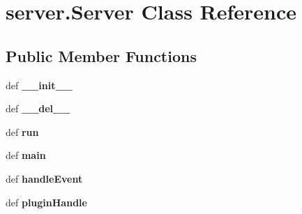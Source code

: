 \hypertarget{classserver_1_1_server}{\section{server.\-Server \-Class \-Reference}
\label{classserver_1_1_server}
}
\subsection*{\-Public \-Member \-Functions}
\begin{DoxyCompactItemize}
\item 
\hypertarget{classserver_1_1_server_a423441de73b670b0f72d1cd83e6e9b96}{def {\bfseries \-\_\-\-\_\-init\-\_\-\-\_\-}}\label{classserver_1_1_server_a423441de73b670b0f72d1cd83e6e9b96}

\item 
\hypertarget{classserver_1_1_server_ac80c3a945398c3c941f5d0820c823b88}{def {\bfseries \-\_\-\-\_\-del\-\_\-\-\_\-}}\label{classserver_1_1_server_ac80c3a945398c3c941f5d0820c823b88}

\item 
\hypertarget{classserver_1_1_server_a9b3fa0cb53b66ff0f4b5cab8257e1f97}{def {\bfseries run}}\label{classserver_1_1_server_a9b3fa0cb53b66ff0f4b5cab8257e1f97}

\item 
\hypertarget{classserver_1_1_server_a00234be60c5d9f6fcb3dd40ce8b7eaf0}{def {\bfseries main}}\label{classserver_1_1_server_a00234be60c5d9f6fcb3dd40ce8b7eaf0}

\item 
\hypertarget{classserver_1_1_server_a27e7213342658fc1f0a689647963be9a}{def {\bfseries handle\-Event}}\label{classserver_1_1_server_a27e7213342658fc1f0a689647963be9a}

\item 
\hypertarget{classserver_1_1_server_a96a93fb7b3ede34e861cba3952cd85e2}{def {\bfseries plugin\-Handle}}\label{classserver_1_1_server_a96a93fb7b3ede34e861cba3952cd85e2}

\end{DoxyCompactItemize}
